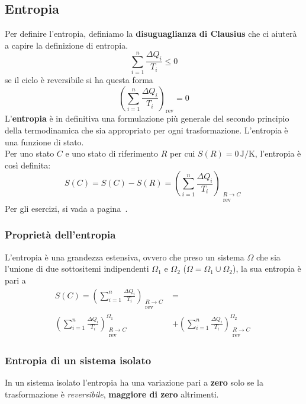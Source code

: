 \subsection{Entropia}\label{subsec:termodinamica:entropia}
Per definire l'entropia, definiamo la \textbf{disuguaglianza di Clausius} che ci aiuterà a capire la 
definizione di entropia.
\begin{equation*}
  \sum\limits_{i = 1}^{n}\frac{\Delta Q_i}{T_i} \leq 0
\end{equation*}
se il ciclo è reversibile si ha questa forma
\begin{equation*}
  \left(\sum\limits_{i = 1}^{n}\frac{\Delta Q_i}{T_i}\right)_\text{rev} = 0
\end{equation*}
L'\textbf{entropia} è in definitiva una formulazione più generale del secondo principio della 
termodinamica che sia appropriato per ogni trasformazione. L'entropia è una funzione di stato.\\
Per uno stato $C$ e uno stato di riferimento $R$ per cui $S(R) = 0\,\text{J/K}$, l'entropia è così 
definita:
\begin{equation*}
  S(C) = S(C) - S(R) = \left(\sum\limits_{i = 1}^{n}\frac{\Delta Q_i}{T_i}\right)_{\substack{R\to C\\
  \text{rev}}}
\end{equation*}
Per gli esercizi, si vada a pagina~\pageref{ex:entropia}.

\subsubsection{Proprietà dell'entropia}
L'entropia è una grandezza estensiva, ovvero che preso un sistema $\Omega$ che sia l'unione di due
sottositemi indipendenti $\Omega_1$ e $\Omega_2$ ($\Omega = \Omega_1 \cup \Omega_2$), la sua entropia
è pari a
\begin{align*}
  S(C) = \left(\sum\limits_{i=1}^{n}\frac{\Delta Q_i}{T_i}\right)_{\substack{R\to C\\\text{rev}}} &=\\ 
  \left(\sum\limits_{i=1}^{n}\frac{\Delta Q_i}{T_i}\right)^{\Omega_1}_{\substack{R\to C\\\text{rev}}} &+
  \left(\sum\limits_{i=1}^{n}\frac{\Delta Q_i}{T_i}\right)^{\Omega_2}_{\substack{R\to C\\\text{rev}}}
\end{align*}

\subsubsection{Entropia di un sistema isolato}
In un sistema isolato l'entropia ha una variazione pari a \textbf{zero} solo se la trasformazione è
\textit{reversibile}, \textbf{maggiore di zero} altrimenti.

